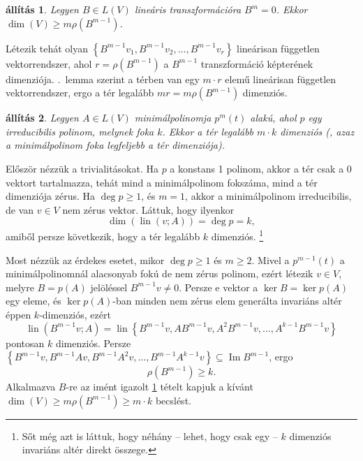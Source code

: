 \documentclass[9pt, a4paper, showtrims]{memoir}
\makeatletter
\let\Aref\relax
\renewenvironment{proof}[1][\proofname]
    {\par\pushQED{\qed}%
    \normalfont \topsep6\p@\@plus6\p@\relax
    \trivlist
    \item[\hskip\labelsep
        \itshape
    #1\@addpunct{:}]\ignorespaces}
    {\popQED\endtrivlist\@endpefalse}
\theoremstyle{plain}
\newtheorem{proposition}{állítás}[chapter]
\theoremstyle{remark}
\theoremstyle{definition}
\DeclareMathOperator{\lin}{lin}
\DeclareMathOperator{\im}{Im}
\makeatother
\begin{document}
\begin{proposition}
	Legyen $B\in L\left( V \right)$ lineáris transzformációra $B^m=0$.
	Ekkor $\dim(V)\geq m\rho\left( B^{m-1} \right)$.
	\label{th:nildim}
\end{proposition}
\begin{proof}
	Létezik tehát olyan $\left\{ B^{m-1}v_1,B^{m-1}v_2,\ldots,B^{m-1}v_r \right\}$
	lineárisan független vektorrendszer, ahol $r=\rho(B^{m-1})$ a $B^{m-1}$ transzformáció képterének dimenziója.
	\Aref{le:nilp-fgtlen}.~lemma szerint a térben van egy $m\cdot r$ elemű lineárisan független vektorrendszer,
	ergo a tér legalább $mr=m\rho\left( B^{m-1} \right)$ dimenziós.
\end{proof}
\begin{proposition}
	Legyen $A\in L\left( V \right)$ minimálpolinomja
	$
		p^{m}\left( t \right)
	$
	alakú,
	ahol $p$ egy irreducibilis polinom, melynek foka $k$.
	Ekkor a tér legalább $m\cdot k$ dimenziós
	(, azaz a minimálpolinom foka legfeljebb a tér dimenziója).
	\label{th:minpol1}
\end{proposition}
\begin{proof}
	Először nézzük a trivialitásokat.
	Ha $p$ a konstans 1 polinom, akkor a tér csak a 0 vektort tartalmazza,
	tehát mind a minimálpolinom fokszáma, mind a tér dimenziója zérus.
	Ha $\deg p\geq 1$, és $m=1$, akkor a minimálpolinom irreducibilis,
	de van $v\in V$ nem zérus vektor.
	Láttuk, hogy ilyenkor
	\[
		\dim\left( \lin\left( v;A \right) \right)=\deg p=k,
	\]
	amiből persze következik, hogy a tér legalább $k$ dimenziós.
	\footnote{Sőt még azt is láttuk, hogy néhány -- lehet, hogy csak egy -- $k$ dimenziós invariáns altér direkt összege.}

	Most nézzük az érdekes esetet,
	mikor $\deg p\geq 1$ és $m\geq 2$.
	Mivel a
	\begin{math}
		p^{m-1}\left( t \right)
	\end{math}
	a minimálpolinomnál alacsonyab fokú de nem zérus polinom,
	ezért létezik $v\in V$, melyre $B=p\left( A \right)$ jelöléssel
	\(
	B^{m-1}v\neq 0.
	\)
	Persze e vektor a $\ker B=\ker p\left( A \right)$
	egy eleme,
	és $\ker p\left( A \right)$-ban minden nem zérus elem generálta invariáns altér éppen $k$-dimenziós,
	ezért
	\[
		\lin(B^{m-1}v;A)=
		\lin\left\{
		B^{m-1}v,
		AB^{m-1}v,
		A^2B^{m-1}v,
		\ldots,
		A^{k-1}B^{m-1}v
		\right\}
	\]
	pontosan $k$ dimenziós.
	Persze $\left\{ B^{m-1}v,B^{m-1}Av,B^{m-1}A^2v,\ldots,B^{m-1}A^{k-1}v \right\}\subseteq \im B^{m-1}$,
	ergo
	\[
		\rho\left( B^{m-1}\right)\geq k.
	\]
	Alkalmazva $B$-re az imént igazolt \ref{th:nildim} tételt kapjuk a kívánt
	\(
	\dim(V)\geq m\rho\left( B^{m-1} \right)\geq m\cdot k
	\)
	becslést.
\end{proof}
\end{document}
